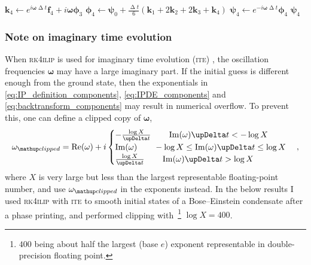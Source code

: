 \begin{breakablealgorithm}
\begin{algorithmic}[1]
        \State $\mathbf{k}_4 \gets e^{i\mathbf{\omega}\upDelta t}\mathbf{f}_4 + i\mathbf{\omega}\mathbf{\phi}_3$
        \State $\mathbf{\phi}_4 \gets
                \mathbf{\psi}_0 + \frac{\upDelta t}{6}\left(\mathbf{k}_1 + 2\mathbf{k}_2 + 2\mathbf{k}_3 + \mathbf{k}_4\right)$
        \State $\mathbf{\psi}_4 \gets e^{-i\mathbf{\omega}\upDelta t}\mathbf{\phi}_4$
        \State \Return $\mathbf{\psi}_4$
    \EndFunction
    \end{algorithmic}
\end{breakablealgorithm}

\subsubsection{Note on imaginary time evolution}

When \textsc{rk4ilip} is used for imaginary time evolution (\textsc{ite}) \cite{chiofalo2000}, the oscillation frequencies $\mathbf{\omega}$ may have a large imaginary part. If the initial guess is different enough from the ground state, then the exponentials in \eqref{eq:IP_definition_components}, \eqref{eq:IPDE_components} and \eqref{eq:backtransform_components} may result in numerical overflow. To prevent this, one can define a clipped copy of $\mathbf{\omega}$,
\begin{align}
\mathbf{\omega}_\up{clipped} = \re(\mathbf{\omega}) + i\begin{cases}
-\frac{\log X}{\upDelta t}\qquad \im(\mathbf{\omega})\upDelta t < -\log X\\
\im(\mathbf{\omega})\qquad       -\log X \leq \im(\mathbf{\omega})\upDelta t \leq \log X\\
\frac{\log X}{\upDelta t}\qquad  \im(\mathbf{\omega})\upDelta t > \log X
\end{cases},
\end{align}
where $X$ is very large but less than the largest representable floating-point number, and use $\mathbf{\omega}_\up{clipped}$ in the exponents instead. In the below results I used \textsc{rk4ilip} with \textsc{ite} to smooth initial states of a Bose--Einstein condensate after a phase printing, and performed clipping with~\footnote{$400$ being about half the largest (base $e$) exponent representable in double-precision floating point.} $\log X = 400$.

